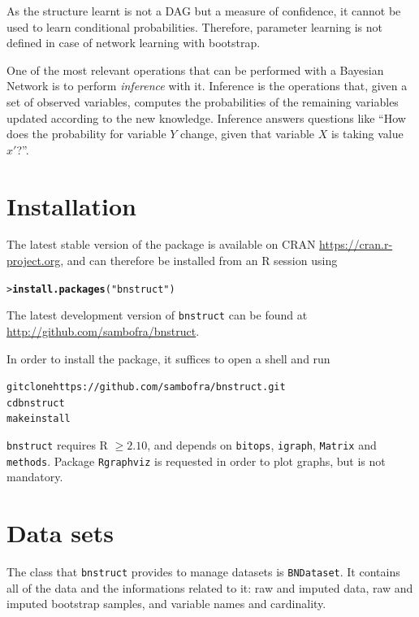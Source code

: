 \documentclass{article}\usepackage[]{graphicx}\usepackage[]{color}
\makeatletter
\newcommand{\hlstr}[1]{\textcolor[rgb]{0.192,0.494,0.8}{#1}}%
\newcommand{\hlstd}[1]{\textcolor[rgb]{0.345,0.345,0.345}{#1}}%
\newcommand{\hlkwd}[1]{\textcolor[rgb]{0.737,0.353,0.396}{\textbf{#1}}}%
\newenvironment{kframe}{%
 \def\at@end@of@kframe{}%
 \ifinner\ifhmode%
  \def\at@end@of@kframe{\end{minipage}}%
  \begin{minipage}{\columnwidth}%
 \fi\fi%
 \def\FrameCommand##1{\hskip\@totalleftmargin \hskip-\fboxsep
 \colorbox{shadecolor}{##1}\hskip-\fboxsep
     \hskip-\linewidth \hskip-\@totalleftmargin \hskip\columnwidth}%
 \MakeFramed {\advance\hsize-\width
   \@totalleftmargin\z@ \linewidth\hsize
   \@setminipage}}%
 {\par\unskip\endMakeFramed%
 \at@end@of@kframe}
\newenvironment{knitrout}{}{} %
\newcommand{\Robject}[1]{{\texttt{#1}}}
\newcommand{\Rpackage}[1]{{\texttt{#1}}}
\makeatother
\begin{document}
As the structure learnt is not a DAG but a measure of confidence, it cannot be used to learn conditional probabilities.
Therefore, parameter learning is not defined in case of network learning with bootstrap.

One of the most relevant operations that can be performed with a Bayesian Network is to perform \emph{inference} with it.
Inference is the operations that, given a set of observed variables, computes the probabilities of the remaining variables
updated according to the new knowledge. Inference answers questions like ``How does the probability for variable
$Y$ change, given that variable $X$ is taking value $x\prime$?''.

\section{Installation}
The latest stable version of the package is available on CRAN \url{https://cran.r-project.org},
and can therefore be installed from an R session using
\begin{knitrout}
\color{fgcolor}\begin{kframe}
\begin{alltt}
\hlstd{> }\hlkwd{install.packages}\hlstd{(}\hlstr{"bnstruct"}\hlstd{)}
\end{alltt}
\end{kframe}
\end{knitrout}

The latest development version of \Rpackage{bnstruct} can be found at \url{http://github.com/sambofra/bnstruct}.

In order to install the package, it suffices to open a shell and run
\begin{knitrout}
\color{fgcolor}\begin{kframe}
\begin{alltt}
git clone https://github.com/sambofra/bnstruct.git
cd bnstruct
make install
\end{alltt}
\end{kframe}
\end{knitrout}

\Rpackage{bnstruct} requires R $\geq 2.10$,
and depends on \Rpackage{bitops}, \Rpackage{igraph}, \Rpackage{Matrix} and \Rpackage{methods}.
Package \Rpackage{Rgraphviz} is requested in order to plot graphs, but is not mandatory.


\section{Data sets}
The class that \Rpackage{bnstruct} provides to manage datasets is \Robject{BNDataset}.
It contains all of the data and the informations related to it: raw and imputed data, raw and imputed
bootstrap samples, and variable names and cardinality.
\end{document}
